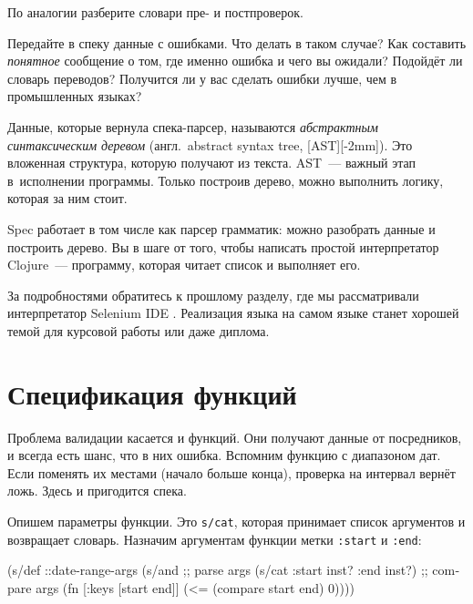 \noindent
По аналогии разберите словари пре- и постпроверок.

Передайте в спеку данные с ошибками. Что делать в таком случае? Как составить
\emph{понятное} сообщение о том, где именно ошибка и чего вы ожидали? Подойдёт ли
словарь переводов? Получится ли у вас сделать ошибки лучше, чем в промышленных
языках?

Данные, которые вернула спека-парсер, называются \emph{абстрактным синтаксическим деревом}
(англ.~abstract syntax tree, [AST][-2mm]).
Это вложенная структура, которую получают из текста. AST~--- важный этап в~исполнении
программы. Только построив дерево, можно выполнить логику, которая за ним стоит.


Spec работает в том числе как парсер грамматик: можно разобрать данные и
построить дерево. Вы в шаге от того, чтобы написать простой интерпретатор
Clojure~--- программу, которая читает список и выполняет его.

За подробностями обратитесь к прошлому разделу, где мы рассматривали
интерпретатор Selenium IDE . Реализация языка на самом языке
станет хорошей темой для курсовой работы или даже диплома.

\section{Спецификация функций}


Проблема валидации касается и функций. Они получают данные от посредников, и
всегда есть шанс, что в них ошибка. Вспомним функцию с диапазоном дат. Если
поменять их местами (начало больше конца), проверка на интервал вернёт
ложь. Здесь и пригодится спека.

Опишем параметры функции. Это \verb|s/cat|, которая принимает список аргументов
и возвращает словарь. Назначим аргументам функции метки \verb|:start| и
\verb|:end|:

\ifx\DEVICETYPE\MOBILE

\begin{english}
  \begin{clojure}
(s/def ::date-range-args
  (s/and
    ;; parse args
    (s/cat :start inst? :end inst?)
    ;; compare args
    (fn [{:keys [start end]}]
      (<= (compare start end) 0))))
  \end{clojure}
\end{english}

